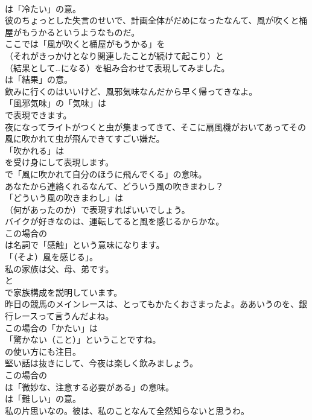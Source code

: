 \documentclass[8pt]{extreport}
\begin{document}
\begin{CJK}{UTF8}{min}
\\	は「冷たい」の意。	
\\	彼のちょっとした失言のせいで、計画全体がだめになったなんて、風が吹くと桶屋がもうかるというようなものだ。 
\\	ここでは「風が吹くと桶屋がもうかる」を
\\	（それがきっかけとなり関連したことが続けて起こり）と
\\	（結果として…になる）を組み合わせて表現してみました。
\\	は「結果」の意。	
\\	飲みに行くのはいいけど、風邪気味なんだから早く帰ってきなよ。 
\\	「風邪気味」の「気味」は 
\\	で表現できます。	
\\	夜になってライトがつくと虫が集まってきて、そこに扇風機がおいてあってその風に吹かれて虫が飛んできてすごい嫌だ。 
\\	「吹かれる」は 
\\	を受け身にして表現します。
\\	で「風に吹かれて自分のほうに飛んでくる」の意味。	
\\	あなたから連絡くれるなんて、どういう風の吹きまわし？ 
\\	「どういう風の吹きまわし」は 
\\	（何があったのか）で表現すればいいでしょう。	
\\	バイクが好きなのは、運転してると風を感じるからかな。 
\\	この場合の
\\	は名詞で「感触」という意味になります。
\\	「（そよ）風を感じる」。	
\\	私の家族は父、母、弟です。 
\\	と 
\\	で家族構成を説明しています。	
\\	昨日の競馬のメインレースは、とってもかたくおさまったよ。ああいうのを、銀行レースって言うんだよね。 
\\	この場合の「かたい」は
\\	「驚かない（こと）」ということですね。
\\	の使い方にも注目。	
\\	堅い話は抜きにして、今夜は楽しく飲みましょう。 
\\	この場合の
\\	は「微妙な、注意する必要がある」の意味。
\\	は「難しい」の意。	
\\	私の片思いなの。彼は、私のことなんて全然知らないと思うわ。 

\end{CJK}
\end{document}
